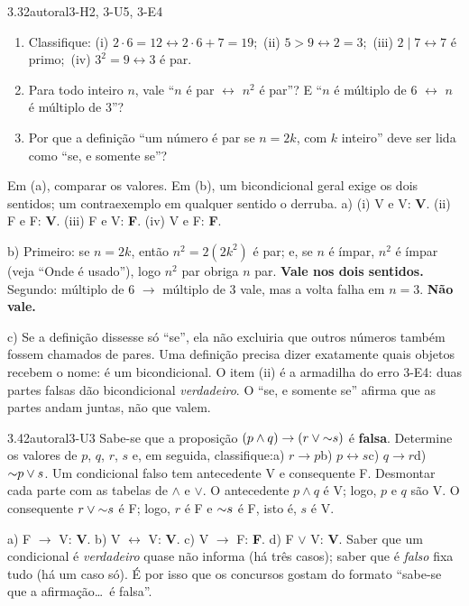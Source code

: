 \begin{exemplo}{3.3}{2}{autoral}{3-H2, 3-U5, 3-E4}\label{ex:3.3}
\begin{enumerate}[label=\alph*)]
  \item Classifique: (i) $2\cdot6=12\leftrightarrow 2\cdot6+7=19$;\ (ii) $5>9\leftrightarrow 2=3$;\ (iii) $2\mid7\leftrightarrow 7$ é primo;\ (iv) $3^2=9\leftrightarrow 3$ é par.
  \item Para todo inteiro $n$, vale \enquote{$n$ é par $\leftrightarrow$ $n^2$ é par}? E \enquote{$n$ é múltiplo de 6 $\leftrightarrow$ $n$ é múltiplo de 3}?
  \item Por que a definição \enquote{um número é par se $n=2k$, com $k$ inteiro} deve ser lida como \enquote{se, e somente se}?
\end{enumerate}
\plano Em (a), comparar os valores. Em (b), um bicondicional geral exige os dois sentidos; um contraexemplo em qualquer sentido o derruba.
\resolucao
a) (i) V e V: \textbf{V}. (ii) F e F: \textbf{V}. (iii) F e V: \textbf{F}. (iv) V e F: \textbf{F}.
\par b) Primeiro: se $n=2k$, então $n^2=2(2k^2)$ é par; e, se $n$ é ímpar, $n^2$ é ímpar (veja \enquote{Onde é usado}), logo $n^2$ par obriga $n$ par. \textbf{Vale nos dois sentidos.} Segundo: múltiplo de 6 $\rightarrow$ múltiplo de 3 vale, mas a volta falha em $n=3$. \textbf{Não vale.}
\par c) Se a definição dissesse só \enquote{se}, ela não excluiria que outros números também fossem chamados de pares. Uma definição precisa dizer exatamente quais objetos recebem o nome: é um bicondicional.
\comentario O item (ii) é a armadilha do erro 3-E4: duas partes falsas dão bicondicional \emph{verdadeiro}. O \enquote{se, e somente se} afirma que as partes andam juntas, não que valem.
\end{exemplo}

\begin{exemplo}{3.4}{2}{autoral}{3-U3}\label{ex:3.4}
Sabe-se que a proposição $(p\wedge q)\rightarrow(r\vee{{\sim}}s)$ é \textbf{falsa}. Determine os valores de $p$, $q$, $r$, $s$ e, em seguida, classifique:\quad a) $r\rightarrow p$\quad b) $p\leftrightarrow s$\quad c) $q\rightarrow r$\quad d) ${{\sim}}p\vee s$.
\plano Um condicional falso tem antecedente V e consequente F. Desmontar cada parte com as tabelas de $\wedge$ e $\vee$.
\resolucao
O antecedente $p\wedge q$ é V; logo, $p$ e $q$ são V. O consequente $r\vee{{\sim}}s$ é F; logo, $r$ é F e ${{\sim}}s$ é F, isto é, $s$ é V.
\par a) F $\rightarrow$ V: \textbf{V}. b) V $\leftrightarrow$ V: \textbf{V}. c) V $\rightarrow$ F: \textbf{F}. d) F $\vee$ V: \textbf{V}.
\comentario Saber que um condicional é \emph{verdadeiro} quase não informa (há três casos); saber que é \emph{falso} fixa tudo (há um caso só). É por isso que os concursos gostam do formato \enquote{sabe-se que a afirmação\ldots\ é falsa}.
\end{exemplo}

